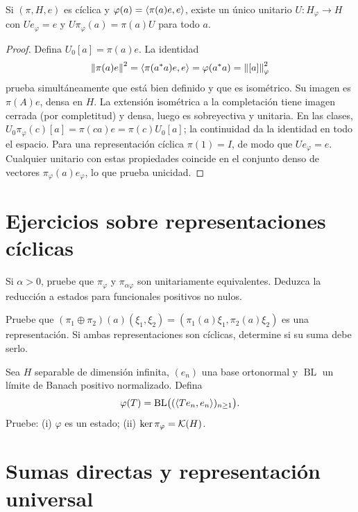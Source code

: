 \begin{teorema}\label{v3:unicidad-gns}
Si $(\pi,H,e)$ es cíclica y $\varphi(a)=\left\langle\pi(a)e,e\right\rangle$, existe un único unitario $U:H_\varphi\to H$ con $Ue_\varphi=e$ y $U\pi_\varphi(a)=\pi(a)U$ para todo $a$.
\end{teorema}
\begin{proof}
Defina $U_0[a]=\pi(a)e$. La identidad
\[
 \left\lVert\pi(a)e\right\rVert^2=\left\langle\pi(a^*a)e,e\right\rangle
 =\varphi(a^*a)=\left\lVert[a]\right\rVert_\varphi^2
\]
prueba simultáneamente que está bien definido y que es isométrico. Su imagen es $\pi(A)e$, densa en $H$. La extensión isométrica a la completación tiene imagen cerrada (por completitud) y densa, luego es sobreyectiva y unitaria. En las clases, $U_0\pi_\varphi(c)[a]=\pi(ca)e=\pi(c)U_0[a]$; la continuidad da la identidad en todo el espacio. Para una representación cíclica $\pi(1)=I$, de modo que $Ue_\varphi=e$. Cualquier unitario con estas propiedades coincide en el conjunto denso de vectores $\pi_\varphi(a)e_\varphi$, lo que prueba unicidad.
\end{proof}

\section{Ejercicios sobre representaciones cíclicas}

\begin{ejercicio}\label{ej:v3-l29-1}
Si $\alpha>0$, pruebe que $\pi_\varphi$ y $\pi_{\alpha\varphi}$ son unitariamente equivalentes. Deduzca la reducción a estados para funcionales positivos no nulos.
\end{ejercicio}


\begin{ejercicio}\label{ej:v3-l29-2}
Pruebe que $(\pi_1\oplus\pi_2)(a)(\xi_1,\xi_2)=(\pi_1(a)\xi_1,\pi_2(a)\xi_2)$ es una representación. Si ambas representaciones son cíclicas, determine si su suma debe serlo.
\end{ejercicio}


\begin{ejercicio}\label{ej:v3-l29-3}
Sea $H$ separable de dimensión infinita, $(e_n)$ una base ortonormal y $\operatorname{BL}$ un límite de Banach positivo normalizado. Defina
\[
 \varphi(T)=\operatorname{BL}\bigl((\left\langle Te_n,e_n\right\rangle)_{n\ge1}\bigr).
\]
Pruebe: (i) $\varphi$ es un estado; (ii) $\ker\pi_\varphi=\mathcal K(H)$.
\end{ejercicio}


\section{Sumas directas y representación universal}\label{lec:v3-30}

